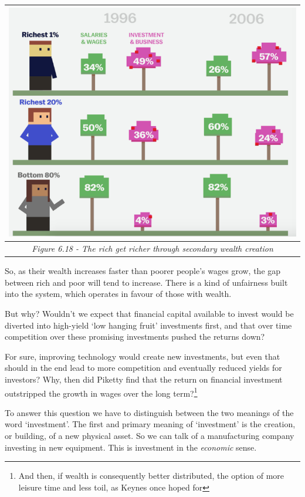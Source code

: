 \documentclass[]{tufte-handout}
\begin{document}
\begin{longtable}[]{@{}c@{}}
\toprule
\includegraphics{ChapterPictures/6-17-richgetricher.png}\tabularnewline
\midrule
\endhead
\emph{Figure 6.18 - The rich get richer through secondary wealth
creation}\tabularnewline
\bottomrule
\end{longtable}

So, as their wealth increases faster than poorer people's wages grow,
the gap between rich and poor will tend to increase. There is a kind of
unfairness built into the system, which operates in favour of those with
wealth.

But why? Wouldn't we expect that financial capital available to invest
would be diverted into high-yield `low hanging fruit' investments first,
and that over time competition over these promising investments pushed
the returns down?

For sure, improving technology would create new investments, but even
that should in the end lead to more competition and eventually reduced
yields for investors? Why, then did Piketty find that the return on
financial investment outstripped the growth in wages over the long
term?\footnote{And then, if wealth is consequently better distributed,
  the option of more leisure time and less toil, as Keynes once hoped
  for}

To answer this question we have to distinguish between the two meanings
of the word `investment'. The first and primary meaning of `investment'
is the creation, or building, of a new physical asset. So we can talk of
a manufacturing company investing in new equipment. This is investment
in the \emph{economic} sense.
\end{document}
